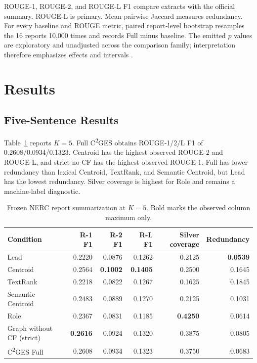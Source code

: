 \documentclass[applsci,article,submit,moreauthors]{Definitions/mdpi}
\newcommand{\cges}{C\textsuperscript{2}GES}
\begin{document}
ROUGE-1, ROUGE-2, and ROUGE-L F1 compare extracts with the official summary. ROUGE-L is primary. Mean pairwise Jaccard measures redundancy. For every baseline and ROUGE metric, paired report-level bootstrap resamples the 16 reports 10,000 times and records Full minus baseline. The emitted $p$ values are exploratory and unadjusted across the comparison family; interpretation therefore emphasizes effects and intervals \cite{cameron2008bootstrap}.

\section{Results}

\subsection{Five-Sentence Results}

Table~\ref{tab:k5} reports $K=5$. Full \cges{} obtains ROUGE-1/2/L F1 of 0.2608/0.0934/0.1323. Centroid has the highest observed ROUGE-2 and ROUGE-L, and strict no-CF has the highest observed ROUGE-1. Full has lower redundancy than lexical Centroid, TextRank, and Semantic Centroid, but Lead has the lowest redundancy. Silver coverage is highest for Role and remains a machine-label diagnostic.

\begin{table}[H]
\caption{Frozen NERC report summarization at $K=5$. Bold marks the observed column maximum only.}
\label{tab:k5}
\centering
\begin{tabular}{lrrrrr}
\toprule
Condition & R-1 F1 & R-2 F1 & R-L F1 & Silver coverage & Redundancy\\
\midrule
Lead & 0.2220 & 0.0876 & 0.1262 & 0.2125 & \textbf{0.0539}\\
Centroid & 0.2564 & \textbf{0.1002} & \textbf{0.1405} & 0.2500 & 0.1645\\
TextRank & 0.2218 & 0.0822 & 0.1267 & 0.1625 & 0.1845\\
Semantic Centroid & 0.2483 & 0.0889 & 0.1270 & 0.2125 & 0.1031\\
Role & 0.2367 & 0.0831 & 0.1185 & \textbf{0.4250} & 0.0614\\
Graph without CF (strict) & \textbf{0.2616} & 0.0924 & 0.1320 & 0.3875 & 0.0805\\
\cges{} Full & 0.2608 & 0.0934 & 0.1323 & 0.3750 & 0.0683\\
\bottomrule
\end{tabular}
\end{table}
\end{document}
